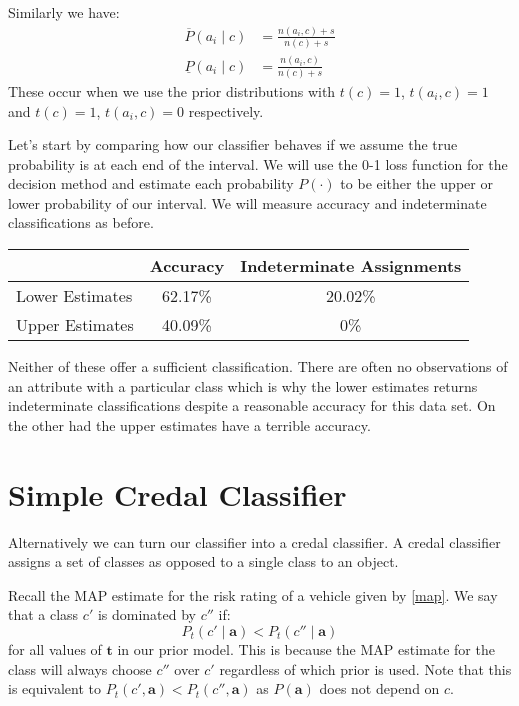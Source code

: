 Similarly we have:
\begin{align}
	\overline{P}(a_i \mid c) & = \frac{n(a_i, c) + s}{n(c)+s} \\
	\underline{P}(a_i \mid c) & = \frac{n(a_i, c)}{n(c)+s}
\end{align}
These occur when we use the prior distributions with $t(c) = 1$, $t(a_i, c)=1$ and $t(c) = 1$, $t(a_i, c)=0$ respectively.

Let's start by comparing how our classifier behaves if we assume the true probability is at each end of the interval.
We will use the 0-1 loss function for the decision method and estimate each probability $P(\cdot)$ to be either the upper or lower probability of our interval.
We will measure accuracy and indeterminate classifications as before.

\begin{center}
	\begin{tabular}{l|c c}
	                & Accuracy & Indeterminate Assignments \\
	\hline
	Lower Estimates & 62.17\%  & 20.02\%            \\
	Upper Estimates & 40.09\%  & 0\%                \\
	\end{tabular}
\end{center}

Neither of these offer a sufficient classification.
There are often no observations of an attribute with a particular class which is why the lower estimates returns indeterminate classifications despite a reasonable accuracy for this data set.
On the other had the upper estimates have a terrible accuracy.

\section{Simple Credal Classifier}
Alternatively we can turn our classifier into a credal classifier.
A credal classifier assigns a set of classes as opposed to a single class to an object.

Recall the MAP estimate for the risk rating of a vehicle given by \cref{map}.
We say that a class $c'$ is dominated by $c''$ if:
\begin{equation}\label{Credal Dominance}
	P_t(c' \mid \mathbf{a}) < P_t(c'' \mid \mathbf{a})
\end{equation}
for all values of $\mathbf{t}$ in our prior model.
This is because the MAP estimate for the class will always choose $c''$ over $c'$ regardless of which prior is used.
Note that this is equivalent to $P_t(c', \mathbf{a}) < P_t(c'', \mathbf{a})$ as $P(\mathbf{a})$ does not depend on $c$.

